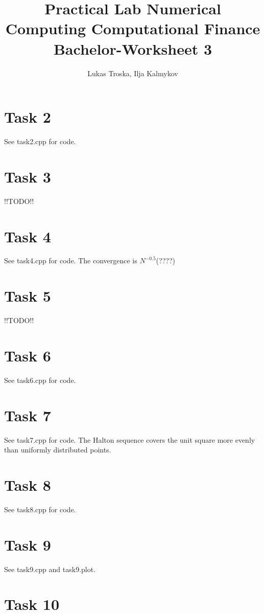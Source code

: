 \documentclass[]{article}
\title{Practical Lab Numerical Computing Computational Finance \\Bachelor-Worksheet 3}
\author{Lukas Troska, Ilja Kalmykov}
\date{}
\begin{document}
\maketitle
\section*{Task 2}
See task2.cpp for code.

\section*{Task 3}
!!TODO!!

\section*{Task 4}
See task4.cpp for code. The convergence is $N^{-0.5}$(????)

\section*{Task 5}
!!TODO!!

\section*{Task 6}
See task6.cpp for code.

\section*{Task 7}
See task7.cpp for code. The Halton sequence covers the unit square more evenly than uniformly distributed points.

\section*{Task 8}
See task8.cpp for code.

\section*{Task 9}
See task9.cpp and task9.plot.

\section*{Task 10}
\end{document}
